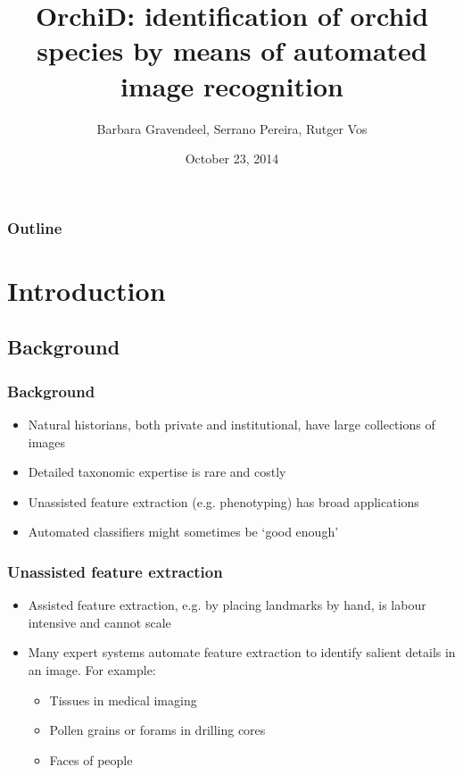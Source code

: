 \documentclass[]{beamer}
\title[OrchiD]
    {OrchiD: identification of orchid species by means of automated image recognition}
\author[Gravendeel, Pereira, Vos]
    {Barbara Gravendeel\inst{1}, Serrano Pereira\inst{1}, Rutger Vos\inst{1}}
\institute[Naturalis Biodiversity Center]
{
  \inst{1}
  Naturalis Biodiversity Center, The Netherlands
}
\date{October 23, 2014}
\begin{document}
\frame{\titlepage}

\begin{frame}
    \frametitle{Outline}
    \tableofcontents
\end{frame}


\section{Introduction}

	\subsection{Background}
	\begin{frame}
		\frametitle{Background}
		\begin{itemize}
			\item Natural historians, both private and institutional, have large
			collections of images
			\item Detailed taxonomic expertise is rare and costly
			\item Unassisted feature extraction (e.g. phenotyping) has broad applications
			\item Automated classifiers might sometimes be `good enough'
		\end{itemize}
	\end{frame}

	\begin{frame}
		\frametitle{Unassisted feature extraction}
		\begin{itemize}
			\item Assisted feature extraction, e.g. by placing landmarks by hand, is
			labour intensive and cannot scale
			\item Many expert systems automate feature extraction to identify salient
			details in an image. For example:
			\begin{itemize}
				\item Tissues in medical imaging
				\item Pollen grains or forams in drilling cores
				\item Faces of people
			\end{itemize}
		\end{itemize}
	\end{frame}
\end{document}
